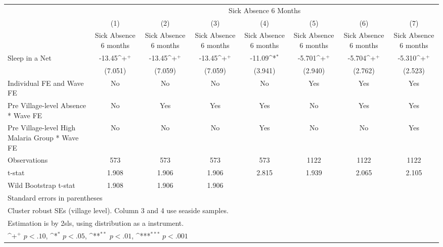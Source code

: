 {
\def\sym#1{\ifmmode^{#1}\else\(^{#1}\)\fi}
\begin{tabular}{l*{7}{c}}
\hline\hline
                    &\multicolumn{7}{c}{Sick Absence 6 Months}                                                                                                                \\
                    &\multicolumn{1}{c}{(1)}&\multicolumn{1}{c}{(2)}&\multicolumn{1}{c}{(3)}&\multicolumn{1}{c}{(4)}&\multicolumn{1}{c}{(5)}&\multicolumn{1}{c}{(6)}&\multicolumn{1}{c}{(7)}\\
                    &\multicolumn{1}{c}{Sick Absence 6 months}&\multicolumn{1}{c}{Sick Absence 6 months}&\multicolumn{1}{c}{Sick Absence 6 months}&\multicolumn{1}{c}{Sick Absence 6 months}&\multicolumn{1}{c}{Sick Absence 6 months}&\multicolumn{1}{c}{Sick Absence 6 months}&\multicolumn{1}{c}{Sick Absence 6 months}\\
\hline
Sleep in a Net      &      -13.45\sym{+}  &      -13.45\sym{+}  &      -13.45\sym{+}  &      -11.09\sym{*}  &      -5.701\sym{+}  &      -5.704\sym{+}  &      -5.310\sym{+}  \\
                    &     (7.051)         &     (7.059)         &     (7.059)         &     (3.941)         &     (2.940)         &     (2.762)         &     (2.523)         \\
[1em]
Individual FE and Wave FE &          No         &          No         &          No         &          No         &         Yes         &         Yes         &         Yes         \\
[1em]
Pre Village-level Absence * Wave FE&          No         &         Yes         &         Yes         &         Yes         &          No         &         Yes         &         Yes         \\
[1em]
Pre Village-level High Malaria Group * Wave FE&          No         &          No         &          No         &         Yes         &          No         &          No         &         Yes         \\
\hline
Observations        &         573         &         573         &         573         &         573         &        1122         &        1122         &        1122         \\
t-stat              &       1.908         &       1.906         &       1.906         &       2.815         &       1.939         &       2.065         &       2.105         \\
Wild Bootstrap t-stat&       1.908         &       1.906         &       1.906         &                     &                     &                     &                     \\
\hline\hline
\multicolumn{8}{l}{\footnotesize Standard errors in parentheses}\\
\multicolumn{8}{l}{\footnotesize Cluster robust SEs (village level). Column 3 and 4 use seaside samples.}\\
\multicolumn{8}{l}{\footnotesize Estimation is by 2sls, using distribution as a instrument.}\\
\multicolumn{8}{l}{\footnotesize \sym{+} \(p<.10\), \sym{*} \(p<.05\), \sym{**} \(p<.01\), \sym{***} \(p<.001\)}\\
\end{tabular}
}
